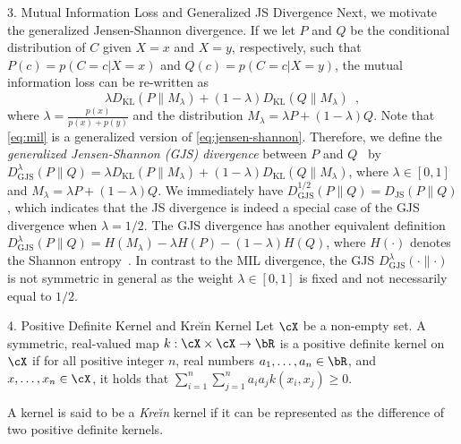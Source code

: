 \documentclass[final]{beamer}
\newcommand{\kr}{Kre\u{\i}n\xspace}
\newcommand{\kl}[2]{D_{\mathrm{KL}}( #1 \parallel #2 )}
\newcommand{\js}[2]{D_{\mathrm{JS}}( #1 \parallel #2 )}
\newcommand{\wjs}[3]{D_{\mathrm{GJS}}^{#1}( #2 \parallel #3 )}
\newlength{\onecolwid}
\begin{document}
\begin{frame}[t]
\begin{columns}[t]
\begin{column}{\onecolwid}
\begin{block}{3. Mutual Information Loss and Generalized JS 
		Divergence}
	Next, we motivate the generalized Jensen-Shannon divergence. If we let $P$ 
	and 
	$Q$ be the conditional distribution of $C$ given $X=x$ and $X=y$, 
	respectively, 
	such that $ P(c) = p(C=c| X=x) $ and $ Q(c)=p(C=c| X=y) $, the mutual 
	information loss can be re-written as
	\begin{equation}\label{eq:mil}
	\lambda \kl{P}{M_\lambda} + (1-\lambda) \kl{Q}{M_\lambda}\enspace,
	\end{equation}
	where  $\lambda=\frac{p(x)}{p(x)+p(y)}$ and the distribution $ 
	M_\lambda=\lambda P + (1-\lambda)Q $.
	Note that \eqref{eq:mil} is a generalized version of 
	\eqref{eq:jensen-shannon}. 
	Therefore, we define the 
	\emph{generalized Jensen-Shannon (GJS) 
		divergence} between $P$ and 
	$Q$~\citep{lin1991divergence,ali1966general,dhillon2003divisive}
	by
	$
	\wjs{\lambda}{P}{Q} = \lambda \kl{P}{M_\lambda} + (1-\lambda) 
	\kl{Q}{M_\lambda}$,
	where $ \lambda\in [0,1] $ and $ M_\lambda=\lambda P + (1-\lambda)Q $. We 
	immediately have $ \wjs{1/2}{P}{Q} = \js{P}{Q} $, which indicates that the 
	JS divergence is indeed a special case of the GJS divergence when $ 
	\lambda=1/2 $. The GJS
	divergence has 
	another equivalent definition
	$
	\wjs{\lambda}{P}{Q} = H(M_\lambda) - \lambda H(P) - 
	(1-\lambda) H(Q)$,
	where $H(\cdot)$ denotes the Shannon entropy~\cite{cover2012elements}. In 
	contrast to the MIL 
	divergence, the GJS $ \wjs{\lambda}{\cdot}{\cdot} $ is not symmetric in 
	general 
	as the weight $ \lambda\in [0,1] $ is fixed and not necessarily equal to $ 
	1/2 
	$. 
\end{block}	
\vspace{3pt}

\begin{block}{4. Positive Definite Kernel and \kr Kernel}
		Let $ \cX $ be a non-empty set. A symmetric, real-valued map $ 
		k:\cX\times\cX\to \bR $ is a positive definite kernel on $ \cX $ if for 
		all 
		positive integer $ n $, real numbers $ a_1,\dots,a_n\in \bR $, and $ 
		x,\dots,x_n\in \cX $, it holds that $
		\sum_{i=1}^n \sum_{j=1}^n a_i a_j k(x_i,x_j) \ge 0$.
	
	A kernel is said to be a \emph{\kr} kernel if it can be represented as 
	the difference of two positive definite kernels. 
	

\end{block}
\end{column}
\end{columns}
\end{frame}
\end{document}
